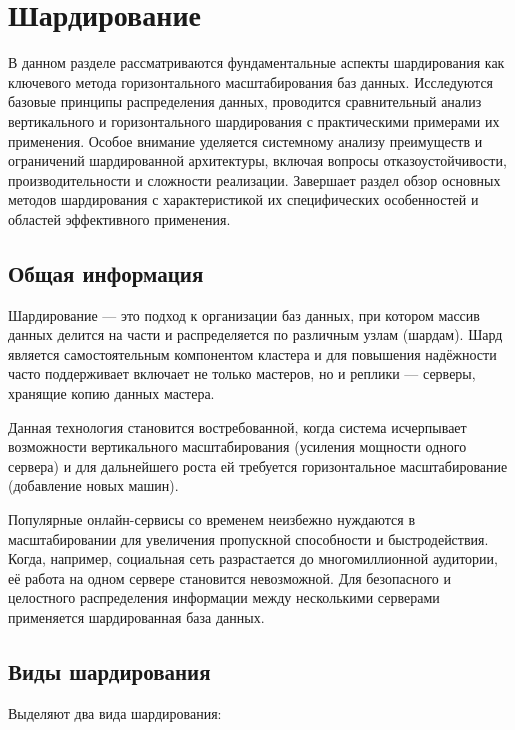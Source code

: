 \section{Шардирование}

В данном разделе рассматриваются фундаментальные аспекты шардирования как
ключевого метода горизонтального масштабирования баз данных. Исследуются
базовые принципы распределения данных, проводится сравнительный анализ
вертикального и горизонтального шардирования с практическими примерами их
применения. Особое внимание уделяется системному анализу преимуществ и
ограничений шардированной архитектуры, включая вопросы отказоустойчивости,
производительности и сложности реализации. Завершает раздел обзор основных
методов шардирования с характеристикой их специфических особенностей и областей
эффективного применения.

\subsection{Общая информация}

Шардирование — это подход к организации баз данных, при котором массив данных
делится на части и распределяется по различным узлам (шардам). Шард является
самостоятельным компонентом кластера и для повышения надёжности часто
поддерживает включает не только мастеров, но и реплики — серверы, хранящие
копию данных мастера.

Данная технология становится востребованной, когда система исчерпывает
возможности вертикального масштабирования (усиления мощности одного сервера) и
для дальнейшего роста ей требуется горизонтальное масштабирование (добавление
новых машин).

Популярные онлайн-сервисы со временем неизбежно нуждаются в масштабировании для
увеличения пропускной способности и быстродействия. Когда, например, социальная
сеть разрастается до многомиллионной аудитории, её работа на одном сервере
становится невозможной. Для безопасного и целостного распределения информации
между несколькими серверами применяется шардированная база данных.

\subsection{Виды шардирования}

Выделяют два вида шардирования:


